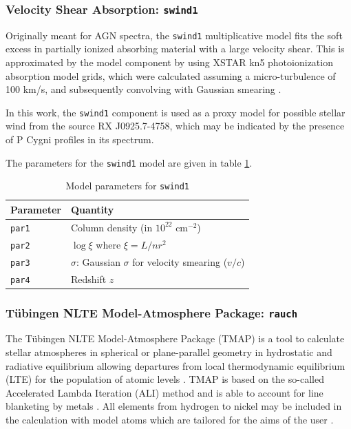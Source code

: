 			\subsubsection{Velocity Shear Absorption: \texttt{swind1}}
				Originally meant for AGN spectra, the \texttt{swind1} multiplicative model fits the soft excess in partially ionized absorbing material with a large velocity shear. This is approximated by the model component by using XSTAR kn5 photoionization absorption model grids, which were calculated assuming a micro-turbulence of 100 km/s, and subsequently convolving with Gaussian smearing \cite{swind1}.
				
				In this work, the \texttt{swind1} component is used as a proxy model for possible stellar wind from the source RX J0925.7-4758, which may be indicated by the presence of P Cygni profiles in its spectrum.
				
				The parameters for the \texttt{swind1} model are given in table \ref{param:swind1}.
				\begin{table}[h!]
					\centering
					\caption{Model parameters for \texttt{swind1}}
					\label{param:swind1}
					\begin{tabular}{p{}p{}}
						\hline
						\textbf{Parameter} & \textbf{Quantity} \\ \hline
						{\texttt{par1}} & {Column density (in $10^{22}$ cm$^{-2}$)} \\ %
						{\texttt{par2}} & {$\log{\xi}$ where $\xi=L/nr^2$} \\ %
						{\texttt{par3}} & {$\sigma$: Gaussian $\sigma$ for velocity smearing ($v/c$)} \\ %
						{\texttt{par4}} & {Redshift $z$} \\ \hline
					\end{tabular}
				\end{table}
			
			\subsubsection{T\"{u}bingen NLTE Model-Atmosphere Package: \texttt{rauch}}
				The T\"{u}bingen NLTE Model-Atmosphere Package (TMAP) is a tool to calculate stellar atmospheres in spherical or plane-parallel geometry in hydrostatic and radiative equilibrium allowing departures from local thermodynamic equilibrium (LTE) for the population of atomic levels \cite{werner1999classical}. TMAP is based on the so-called Accelerated Lambda Iteration (ALI) method and is able to account for line blanketing by metals \cite{rauchALI}. All elements from hydrogen to nickel may be included in the calculation with model atoms which are tailored for the aims of the user \cite{wernerTMAP}.
				
